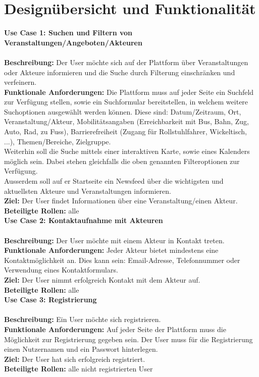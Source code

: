 \documentclass{swp}
\begin{document}
\section{Design\"ubersicht und Funktionalit\"at}
\textbf{Use Case 1: Suchen und Filtern von Veranstaltungen/Angeboten/Akteuren}\\\\
\textbf{Beschreibung:} Der User m\"ochte sich auf der Plattform \"uber Veranstaltungen oder Akteure informieren und die Suche durch Filterung einschr\"anken und verfeinern.\\
\textbf{Funktionale Anforderungen:} Die Plattform muss auf jeder Seite ein Suchfeld zur Verf\"ugung stellen, sowie ein Suchformular bereitstellen, in welchem weitere Suchoptionen ausgew\"ahlt werden k\"onnen. Diese sind: Datum/Zeitraum, Ort, Veranstaltung/Akteur, Mobilit\"atsangaben (Erreichbarkeit mit Bus, Bahn, Zug, Auto, Rad, zu Fu{ss}), Barrierefreiheit (Zugang f\"ur Rollstuhlfahrer, Wickeltisch, ...), Themen/Bereiche, Zielgruppe.\\
Weiterhin soll die Suche mittels einer interaktiven Karte, sowie eines Kalenders m\"oglich sein. Dabei stehen gleichfalls die oben genannten Filteroptionen zur Verf\"ugung.\\
Au{ss}erdem soll auf er Startseite ein Newsfeed \"uber die wichtigsten und aktuellsten Akteure und Veranstaltungen informieren.\\
\textbf{Ziel:} Der User findet Informationen \"uber eine Veranstaltung/einen Akteur.\\
\textbf{Beteiligte Rollen:} alle\\

\textbf{Use Case 2: Kontaktaufnahme mit Akteuren}\\\\
\textbf{Beschreibung: }Der User m\"ochte mit einem Akteur in Kontakt treten.\\
\textbf{Funktionale Anforderungen: }Jeder Akteur bietet mindestens eine Kontaktm\"oglichkeit an. Dies kann sein: Email-Adresse, Telefonnummer oder Verwendung eines Kontaktformulars.\\
\textbf{Ziel: }Der User nimmt erfolgreich Kontakt mit dem Akteur auf.\\
\textbf{Beteiligte Rollen: }alle\\

\textbf{Use Case 3: Registrierung}\\\\
\textbf{Beschreibung: }Ein User m\"ochte sich registrieren.\\
\textbf{Funktionale Anforderungen: }Auf jeder Seite der Plattform muss die M\"oglichkeit zur Registrierung gegeben sein. Der User muss f\"ur die Registrierung einen Nutzernamen und ein Passwort hinterlegen.\\
\textbf{Ziel: }Der User hat sich erfolgreich registriert.\\
\textbf{Beteiligte Rollen: }alle nicht registrierten User\\
\end{document}
